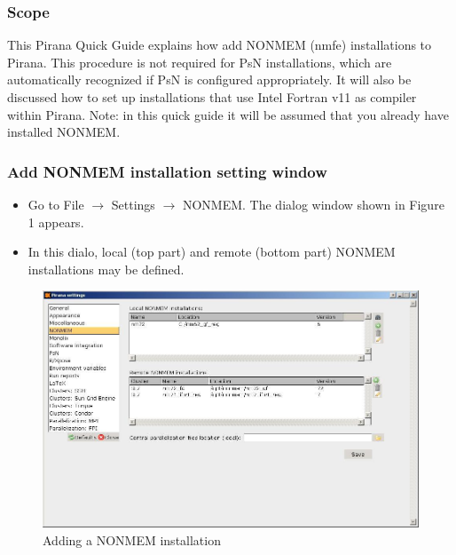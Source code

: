 \begin{center}
   {\colorbox{grey2}{
         \begin{minipage}[t]{0.9\textwidth}
\subsubsection*{Scope}
This Pirana Quick Guide explains how add NONMEM (nmfe) installations
to Pirana. This procedure is not required for PsN installations, which
are automatically recognized if PsN is configured appropriately. It
will also be discussed how to set up installations that use Intel
Fortran v11 as compiler within Pirana. Note: in this quick guide it
will be assumed that you already have installed NONMEM.
          \end{minipage}
      }
   }
\end{center}

\subsubsection*{Add NONMEM installation setting window}
\begin{itemize}
\item Go to File $\rightarrow$ Settings $\rightarrow$ NONMEM. The
  dialog window shown in Figure 1 appears.
\item In this dialo, local (top part) and remote (bottom part) NONMEM
  installations may be defined.
\end{itemize}

\begin{figure}[h] \centering
    \includegraphics[scale=.42]{images/addnonmem_1.jpg}
    \caption{Adding a NONMEM installation\label{fig:Fig1}}
\end{figure}

